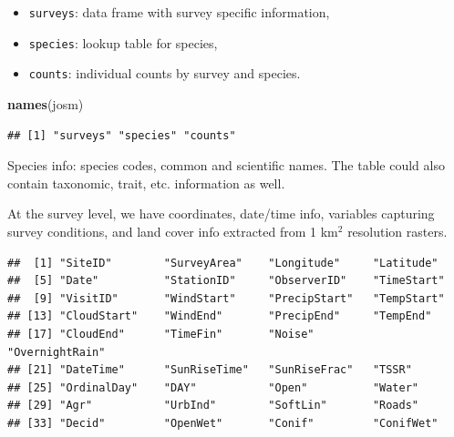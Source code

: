 \documentclass[12pt,]{book}
\newenvironment{Shaded}{\begin{snugshade}}{\end{snugshade}}
\newcommand{\KeywordTok}[1]{\textcolor[rgb]{0.13,0.29,0.53}{\textbf{#1}}}
\newcommand{\NormalTok}[1]{#1}
\newcommand{\OperatorTok}[1]{\textcolor[rgb]{0.81,0.36,0.00}{\textbf{#1}}}
\providecommand{\tightlist}{%
  \setlength{\itemsep}{0pt}\setlength{\parskip}{0pt}}
\begin{document}
\begin{itemize}
\tightlist
\item
  \texttt{surveys}: data frame with survey specific information,
\item
  \texttt{species}: lookup table for species,
\item
  \texttt{counts}: individual counts by survey and species.
\end{itemize}

\begin{Shaded}
\begin{Highlighting}[]
\KeywordTok{names}\NormalTok{(josm)}
\end{Highlighting}
\end{Shaded}

\begin{verbatim}
## [1] "surveys" "species" "counts"
\end{verbatim}

Species info: species codes, common and scientific names. The table could also contain
taxonomic, trait, etc. information as well.

\begin{Shaded}
\end{Shaded}

At the survey level, we have coordinates, date/time info,
variables capturing survey conditions, and land cover info extracted from 1 km\(^2\) resolution rasters.

\begin{Shaded}
\end{Shaded}

\begin{verbatim}
##  [1] "SiteID"        "SurveyArea"    "Longitude"     "Latitude"     
##  [5] "Date"          "StationID"     "ObserverID"    "TimeStart"    
##  [9] "VisitID"       "WindStart"     "PrecipStart"   "TempStart"    
## [13] "CloudStart"    "WindEnd"       "PrecipEnd"     "TempEnd"      
## [17] "CloudEnd"      "TimeFin"       "Noise"         "OvernightRain"
## [21] "DateTime"      "SunRiseTime"   "SunRiseFrac"   "TSSR"         
## [25] "OrdinalDay"    "DAY"           "Open"          "Water"        
## [29] "Agr"           "UrbInd"        "SoftLin"       "Roads"        
## [33] "Decid"         "OpenWet"       "Conif"         "ConifWet"
\end{verbatim}
\end{document}
